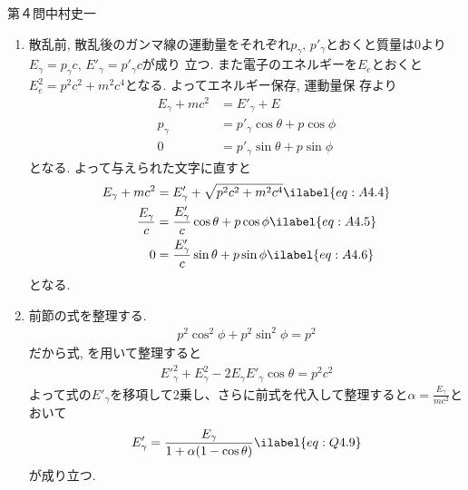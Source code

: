 \begin{answer}{第４問}{中村史一}
\begin{enumerate}
\item
  散乱前, 散乱後のガンマ線の運動量をそれぞれ$p_\gamma,\,p'_\gamma$とおくと質量は0より$E_\gamma=p_\gamma c,\, E'_\gamma=p'_\gamma c$が成り
  立つ. また電子のエネルギーを$E_e$とおくと$E_e^2 = p^2c^2+m^2c^4$となる. よってエネルギー保存, 運動量保
  存より
  \begin{align}
    E_\gamma+mc^2 &=E'_\gamma+E \\
    p_\gamma &=p'_\gamma\cos\theta + p\cos\phi\\
    0 &= p'_\gamma\sin\theta + p\sin\phi
  \end{align}
  となる. よって与えられた文字に直すと
  \begin{align}
    E_\gamma + mc^2 &= E'_\gamma +\sqrt{p^2c^2+m^2c^4} \ilabel{eq:A4.4}\\
    \frac{E_\gamma}c &= \frac{E'_\gamma}c \cos\theta + p\cos\phi \ilabel{eq:A4.5}\\
    0 &= \frac{E'_\gamma}c \sin\theta + p\sin\phi \ilabel{eq:A4.6}
  \end{align}
  となる. 

\item
  前節の式を整理する. 
  \begin{align}
    p^2\cos^2\phi+p^2\sin^2\phi=p^2
  \end{align}
  だから式, を用いて整理すると
  \begin{align}
    E'^2_\gamma + E_\gamma^2 -2E_\gamma E'_\gamma\cos\theta = p^2c^2
  \end{align}
  よって式の$E'_\gamma$を移項して2乗し、さらに前式を代入して整理すると$\alpha=\frac{E_\gamma}{mc^2}$とおいて
  \begin{align}
    E'_\gamma = \frac{E_\gamma}{1+\alpha(1-\cos\theta)} \ilabel{eq:Q4.9}
  \end{align}
  が成り立つ. 


\end{enumerate}
\end{answer}
